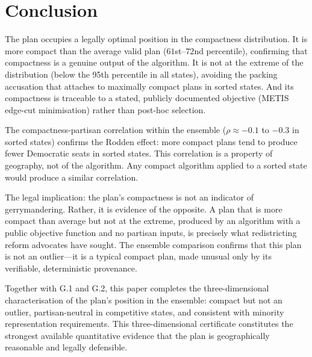 \section{Conclusion}
\label{sec:conclusion}

The \ar{} plan occupies a legally optimal position in the compactness
distribution.  It is more compact than the average valid plan ($61$st--$72$nd
percentile), confirming that compactness is a genuine output of the algorithm.
It is not at the extreme of the distribution (below the 95th percentile in
all states), avoiding the packing accusation that attaches to maximally
compact plans in sorted states.  And its compactness is traceable to a
stated, publicly documented objective (METIS edge-cut minimisation) rather
than post-hoc selection.

The compactness-partisan correlation within the \recom{} ensemble
($\rho \approx -0.1$ to $-0.3$ in sorted states) confirms the Rodden
effect: more compact plans tend to produce fewer Democratic seats in sorted
states.  This correlation is a property of geography, not of the \ar{}
algorithm.  Any compact algorithm applied to a sorted state would produce
a similar correlation.

The legal implication: the \ar{} plan's compactness is not an indicator of
gerrymandering.  Rather, it is evidence of the opposite.  A plan that is
more compact than average but not at the extreme, produced by an algorithm
with a public objective function and no partisan inputs, is precisely what
redistricting reform advocates have sought.  The ensemble comparison confirms
that this plan is not an outlier---it is a typical compact plan, made unusual
only by its verifiable, deterministic provenance.

Together with G.1 and G.2, this paper completes the three-dimensional
characterisation of the \ar{} plan's position in the ensemble:
compact but not an outlier, partisan-neutral in competitive states,
and consistent with minority representation requirements.  This
three-dimensional certificate constitutes the strongest available quantitative
evidence that the \ar{} plan is geographically reasonable and legally
defensible.
